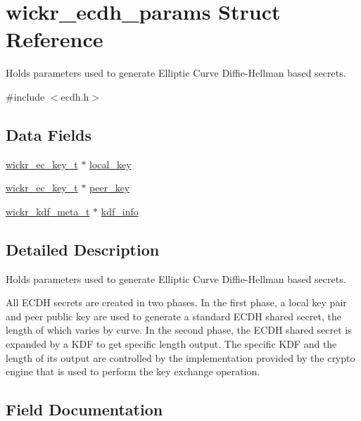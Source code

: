 \hypertarget{structwickr__ecdh__params}{}\section{wickr\+\_\+ecdh\+\_\+params Struct Reference}
\label{structwickr__ecdh__params}


Holds parameters used to generate Elliptic Curve Diffie-\/\+Hellman based secrets.  




{\ttfamily \#include $<$ecdh.\+h$>$}

\subsection*{Data Fields}
\begin{DoxyCompactItemize}
\item 
\mbox{\hyperlink{structwickr__ec__key}{wickr\+\_\+ec\+\_\+key\+\_\+t}} $\ast$ \mbox{\hyperlink{structwickr__ecdh__params_aab5a55e6a516ab8268ef6739ae1422cd}{local\+\_\+key}}
\item 
\mbox{\hyperlink{structwickr__ec__key}{wickr\+\_\+ec\+\_\+key\+\_\+t}} $\ast$ \mbox{\hyperlink{structwickr__ecdh__params_ab17d6191b23fa7fd1befd03b2eee4ba9}{peer\+\_\+key}}
\item 
\mbox{\hyperlink{structwickr__kdf__meta}{wickr\+\_\+kdf\+\_\+meta\+\_\+t}} $\ast$ \mbox{\hyperlink{structwickr__ecdh__params_a0259f327ae0bdcc9e44b1d43a1216cac}{kdf\+\_\+info}}
\end{DoxyCompactItemize}


\subsection{Detailed Description}
Holds parameters used to generate Elliptic Curve Diffie-\/\+Hellman based secrets. 

All E\+C\+DH secrets are created in two phases. In the first phase, a local key pair and peer public key are used to generate a standard E\+C\+DH shared secret, the length of which varies by curve. In the second phase, the E\+C\+DH shared secret is expanded by a K\+DF to get specific length output. The specific K\+DF and the length of it\textquotesingle{}s output are controlled by the implementation provided by the crypto engine that is used to perform the key exchange operation. 

\subsection{Field Documentation}
\mbox{\label{structwickr__ecdh__params_a0259f327ae0bdcc9e44b1d43a1216cac}} 

